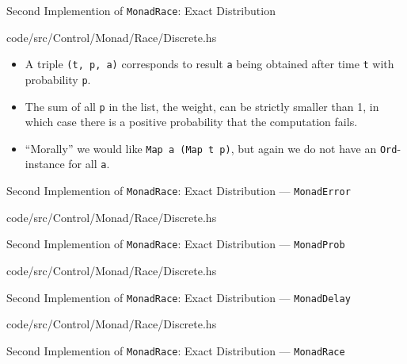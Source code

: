 ﻿\documentclass[aspectratio=169]{beamer}
\begin{document}
\begin{frame}{Second Implemention of {\tt MonadRace}: Exact Distribution}
    
        {code/src/Control/Monad/Race/Discrete.hs}
    \begin{itemize}
        \item
            A triple {\tt(t, p, a)} corresponds to result {\tt a}
            being obtained after time {\tt t} with probability {\tt p}.
        \item
            The sum of all {\tt p} in the list, the \alert{weight},
            can be strictly smaller than 1, in which case there is a
            positive probability that the computation \alert{fails}.
        \item
            ``Morally'' we would like
            {\tt Map a (Map t p)}, but again we do not have an
            {\tt Ord}-instance for all {\tt a}.
    \end{itemize}
\end{frame}

\begin{frame}{Second Implemention of {\tt MonadRace}: Exact Distribution --- \tt MonadError}
    
        {code/src/Control/Monad/Race/Discrete.hs}
\end{frame}

\begin{frame}{Second Implemention of {\tt MonadRace}: Exact Distribution --- \tt MonadProb}
    
        {code/src/Control/Monad/Race/Discrete.hs}
\end{frame}

\begin{frame}{Second Implemention of {\tt MonadRace}: Exact Distribution --- \tt MonadDelay}
    
        {code/src/Control/Monad/Race/Discrete.hs}
\end{frame}

\begin{frame}{Second Implemention of {\tt MonadRace}: Exact Distribution --- \tt MonadRace}
    \vspace{-5mm}
\end{frame}
\end{document}
